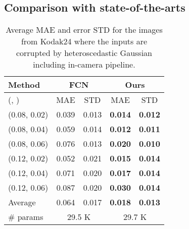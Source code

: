 \documentclass[10pt,twocolumn,letterpaper]{article}
\begin{document}
\subsection{Comparison with state-of-the-arts}
\begin{table}[]
	\centering
	\caption{Average MAE and error STD for the images from Kodak24 where the inputs are corrupted by heteroscedastic Gaussian including in-camera pipeline. }
	\label{table:estimator}
	\begin{adjustbox}{width=0.6\linewidth}
		\begin{tabular}{l|cc|cc}
			\toprule
			Method   & \multicolumn{2}{c|}{FCN} & \multicolumn{2}{c}{Ours} \\
			\hline 
			(, ) & MAE        & STD        & MAE           & STD          \\
			\hline \hline
			(0.08, 0.02)     & 0.039      & 0.013      & \textbf{0.014}         & \textbf{0.012}        \\
			(0.08, 0.04)     & 0.059      & 0.014      & \textbf{0.012}         & \textbf{0.011}        \\
			(0.08, 0.06)     & 0.076      & 0.013      & \textbf{0.020}         & \textbf{0.010}        \\
			(0.12, 0.02)     & 0.052      & 0.021      & \textbf{0.015}         & \textbf{0.014}        \\
			(0.12, 0.04)     & 0.071      & 0.020      & \textbf{0.017}         & \textbf{0.014}        \\
			(0.12, 0.06)     & 0.087      & 0.020      & \textbf{0.030}         & \textbf{0.014}        \\
			\hline
			Average & 0.064 & 0.017& \textbf{0.018}& \textbf{0.013}\\
			\hline
			\# params & \multicolumn{2}{c|}{29.5 K} & \multicolumn{2}{c}{29.7 K} \\			
			\bottomrule			
		\end{tabular}
	\end{adjustbox}
\end{table}
\end{document}
